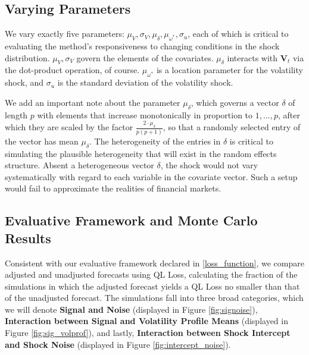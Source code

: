 \documentclass[11pt,3p,review,authoryear]{elsarticle}
\theoremstyle{definition}
\begin{document}
  \subsection{Varying Parameters}
  We vary exactly five parameters: $\mu_{V}, \sigma_{V}, \mu_{\delta}, \mu_{\omega^{*}}, \sigma_{u}$, each of which is critical to evaluating the method's responsiveness to changing conditions in the shock distribution. $\mu_{V}, \sigma_{V}$ govern the elements of the covariates. $\mu_{\delta}$ interacts with $\textbf{V}_{t}$ via the dot-product operation, of course.  $\mu_{\omega^{*}}$ is a location parameter for the volatility shock, and $\sigma_{u}$ is the standard deviation of the volatility shock.
  
  We add an important note about the parameter $\mu_{\delta}$, which governs a vector $\delta$ of length $p$ with elements that increase monotonically in proportion to $1,...,p$, after which they are scaled by the factor $\frac{2\cdot\mu_{\delta}}{p(p+1)}$, so that a randomly selected entry of the vector has mean $\mu_{\delta}$.  The heterogeneity of the entries in $\delta$ is critical to simulating the plausible heterogeneity that will exist in the random effects structure.  Absent a heterogeneous vector $\delta$, the shock would not vary systematically with regard to each variable in the covariate vector.  Such a setup would fail to approximate the realities of financial markets.

\subsection{Evaluative Framework and Monte Carlo Results}
Consistent with our evaluative framework declared in \ref{loss_function}, we compare adjusted and unadjusted forecasts using QL Loss, calculating the fraction of the simulations in which the adjusted forecast yields a QL Loss no smaller than that of the unadjusted forecast.  The simulations fall into three broad categories, which we will denote \textbf{Signal and Noise} (displayed in Figure \ref{fig:signoise}), \textbf{Interaction between Signal and Volatility Profile Means} (displayed in Figure \ref{fig:sig_volprof}), and lastly, \textbf{Interaction between Shock Intercept and Shock Noise} (displayed in Figure \ref{fig:intercept_noise}).  
\end{document}
